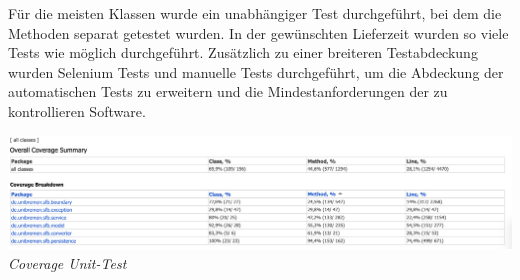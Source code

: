 \documentclass[enabledeprecatedfontcommands,fontsize=12pt,paper=a4,twoside]{scrartcl}
\begin{document}
Für die meisten Klassen wurde ein unabhängiger Test durchgeführt, bei dem die Methoden separat getestet wurden. In der gewünschten  Lieferzeit wurden so viele Tests wie möglich durchgeführt. Zusätzlich zu einer breiteren Testabdeckung wurden Selenium Tests und manuelle Tests durchgeführt, um die Abdeckung der automatischen Tests zu erweitern und die Mindestanforderungen der zu kontrollieren Software.

 \hypertarget{3.4.1.1}{
\includegraphics[width=1\textwidth]{Screenshots/coverage.png}
\textit{ Coverage Unit-Test}
} \\
\end{document}
